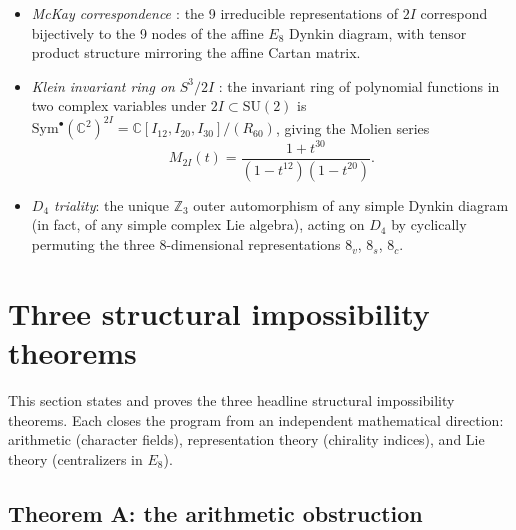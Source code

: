\documentclass[11pt,a4paper]{amsart}
\theoremstyle{definition}
\theoremstyle{remark}
\newcommand{\SU}{\mathrm{SU}}
\newcommand{\Sym}{\mathrm{Sym}}
\newcommand{\bbZ}{\mathbb{Z}}
\newcommand{\bbC}{\mathbb{C}}
\begin{document}
\begin{itemize}
  \item \emph{McKay correspondence \cite{McKay1980}}: the 9 irreducible
    representations of $2I$ correspond bijectively to the 9 nodes of the
    affine $E_8$ Dynkin diagram, with tensor product structure mirroring
    the affine Cartan matrix.

  \item \emph{Klein invariant ring on} $S^3/2I$ \cite{Klein1884}: the
    invariant ring of polynomial functions in two complex variables under
    $2I \subset \SU(2)$ is
    $\Sym^\bullet(\bbC^2)^{2I} = \bbC[I_{12}, I_{20}, I_{30}]/(R_{60})$,
    giving the Molien series
    \[ M_{2I}(t) = \frac{1 + t^{30}}{(1 - t^{12})(1 - t^{20})}. \]

  \item \emph{$D_4$ triality}: the unique $\bbZ_3$ outer automorphism of any
    simple Dynkin diagram (in fact, of any simple complex Lie algebra),
    acting on $D_4$ by cyclically permuting the three 8-dimensional
    representations $8_v$, $8_s$, $8_c$.
\end{itemize}

\section{Three structural impossibility theorems}\label{sec:capstone}

This section states and proves the three headline structural
impossibility theorems. Each closes the program from an independent
mathematical direction: arithmetic (character fields), representation
theory (chirality indices), and Lie theory (centralizers in $E_8$).

\subsection{Theorem A: the arithmetic obstruction}
\end{document}
